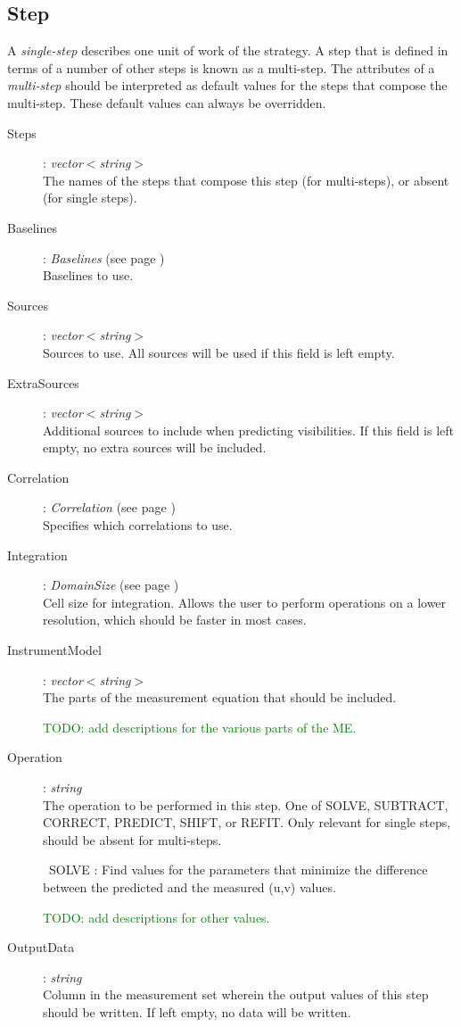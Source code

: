 \documentclass[10pt]{lofar}
\begin{document}
\subsection*{Step}
A \emph{single-step} describes one unit of work of the strategy. A step that
is defined in terms of a number of other steps is known as a multi-step. The
attributes of a \emph{multi-step} should be interpreted as default values for
the steps that compose the multi-step. These default values can always be
overridden.
\begin{description}
\item [Steps] : \emph{vector$<$string$>$} \\
    The names of the steps that compose this step (for multi-steps), or absent
    (for single steps).
\item [Baselines] : \emph{Baselines} (see page \pageref{app-baselines}) \\
    Baselines to use.
\item [Sources] : \emph{vector$<$string$>$} \\
    Sources to use. All sources will be used if this field is left empty.
\item [ExtraSources] : \emph{vector$<$string$>$} \\
    Additional sources to include when predicting visibilities. If this field
    is left empty, no extra sources will be included.
\item [Correlation] : \emph{Correlation}  (see page \pageref{app-correlation}) \\
    Specifies which correlations to use.
\item [Integration] : \emph{DomainSize}  (see page \pageref{app-domainsize}) \\
    Cell size for integration. Allows the user to perform operations on a
    lower resolution, which should be faster in most cases.
\item [InstrumentModel] : \emph{vector$<$string$>$} \\
    The parts of the measurement equation that should be included. \par
    \textcolor{green}{TODO: add descriptions for the various parts of the ME.}
\item [Operation] : \emph{string} \\
    The operation to be performed in this step. One of SOLVE, SUBTRACT,
    CORRECT, PREDICT, SHIFT, or REFIT. Only relevant for single steps, should
    be absent for multi-steps. \par\
    SOLVE : Find values for the parameters that minimize the difference
    between the predicted and the measured (u,v) values. \par
    \textcolor{green}{TODO: add descriptions for other values.}
\item [OutputData] : \emph{string} \\
    Column in the measurement set wherein the output values of this step
    should be written. If left empty, no data will be written.
\end{description}
\end{document}

